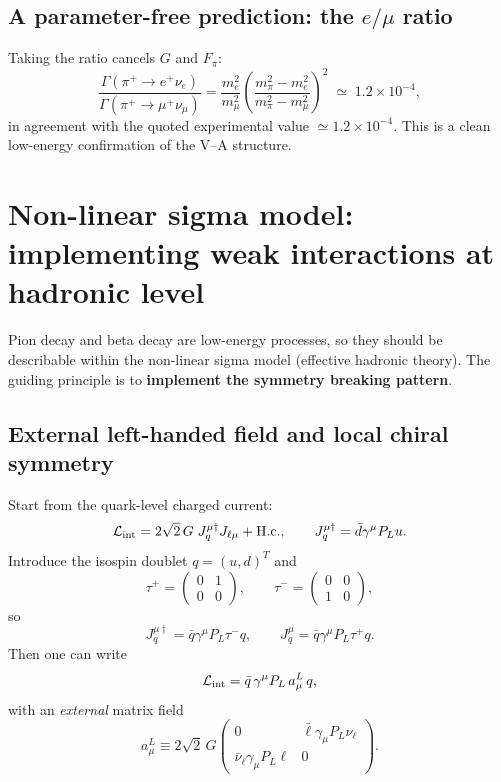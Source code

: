 \subsection{A parameter-free prediction: the $e/\mu$ ratio}
Taking the ratio cancels $G$ and $F_\pi$:
\begin{equation}
\boxed{
\frac{\Gamma(\pi^+\to e^+\nu_e)}{\Gamma(\pi^+\to \mu^+\nu_\mu)}
=
\frac{m_e^2}{m_\mu^2}
\left(\frac{m_\pi^2-m_e^2}{m_\pi^2-m_\mu^2}\right)^2
\;\simeq\;1.2\times 10^{-4},
}
\end{equation}
in agreement with the quoted experimental value $\simeq 1.2\times 10^{-4}$.
This is a clean low-energy confirmation of the V--A structure.

\section{Non-linear sigma model: implementing weak interactions at hadronic level}
Pion decay and beta decay are low-energy processes, so they should be describable
within the non-linear sigma model (effective hadronic theory).
The guiding principle is to \textbf{implement the symmetry breaking pattern}.

\subsection{External left-handed field and local chiral symmetry}
Start from the quark-level charged current:
\begin{equation}
\mathcal{L}_{\rm int}=2\sqrt{2}\,G\;J^{\mu\dagger}_q J_{\ell\mu}+\text{H.c.},
\qquad
J^{\mu\dagger}_q=\bar d\gamma^\mu P_L u.
\end{equation}
Introduce the isospin doublet $q=(u,d)^T$ and
\begin{equation}
\tau^+ =
\begin{pmatrix}
0&1\\
0&0
\end{pmatrix},
\qquad
\tau^- =
\begin{pmatrix}
0&0\\
1&0
\end{pmatrix},
\end{equation}
so
\begin{equation}
J_q^{\mu\dagger}=\bar q\gamma^\mu P_L \tau^- q,
\qquad
J_q^\mu=\bar q\gamma^\mu P_L \tau^+ q.
\end{equation}
Then one can write
\begin{equation}
\mathcal{L}_{\rm int}=\bar q\,\gamma^\mu P_L\,a^L_\mu\,q,
\end{equation}
with an \emph{external} matrix field
\begin{equation}
a^L_\mu \equiv 2\sqrt{2}\,G
\begin{pmatrix}
0 & \bar\ell\gamma_\mu P_L \nu_\ell\\
\bar\nu_\ell\gamma_\mu P_L \ell & 0
\end{pmatrix}.
\end{equation}


